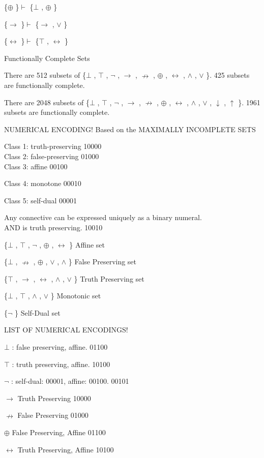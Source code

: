 \{$\oplus$ \}$\vdash$ \{$\bot$ , $\oplus$ \}

\{$\to$ \}$\vdash$ \{$\to$ , $\lor$ \}

\{$\leftrightarrow$ \}$\vdash$ \{$\top$ , $\leftrightarrow$ \}

\protect\hypertarget{anchor-31}{}{}Functionally Complete Sets

There are 512 subsets of \{$\bot$ , $\top$ , $\neg$ , $\to$ , $\nrightarrow$ , $\oplus$ , $\leftrightarrow$ , $\land$ , $\lor$ \}. 425 subsets are
functionally complete.

There are 2048 subsets of \{$\bot$ , $\top$ , $\neg$ , $\to$ , $\nrightarrow$ , $\oplus$ , $\leftrightarrow$ , $\land$ , $\lor$ , $\downarrow$ , $\uparrow$ \}. 1961
subsets are functionally complete.

NUMERICAL ENCODING! Based on the MAXIMALLY INCOMPLETE SETS

Class 1: truth-preserving 10000\\
Class 2: false-preserving 01000\\
Class 3: affine 00100

Class 4: monotone 00010

Class 5: self-dual 00001

Any connective can be expressed uniquely as a binary numeral.\\
AND is truth preserving. 10010

\{$\bot$ , $\top$ , $\neg$ , $\oplus$ , $\leftrightarrow$ \} Affine set

\{$\bot$ , $\nrightarrow$ , $\oplus$ , $\lor$ , $\land$ \} False Preserving set

\{$\top$ , $\to$ , $\leftrightarrow$ , $\land$ , $\lor$ \} Truth Preserving set

\{$\bot$ , $\top$ , $\land$ , $\lor$ \} Monotonic set

\{$\neg$ \} Self-Dual set

LIST OF NUMERICAL ENCODINGS!

$\bot$ : false preserving, affine. 01100

$\top$ : truth preserving, affine. 10100

$\neg$ : self-dual: 00001, affine: 00100. 00101

$\to$  Truth Preserving 10000

$\nrightarrow$  False Preserving 01000

$\oplus$  False Preserving, Affine 01100

$\leftrightarrow$  Truth Preserving, Affine 10100

